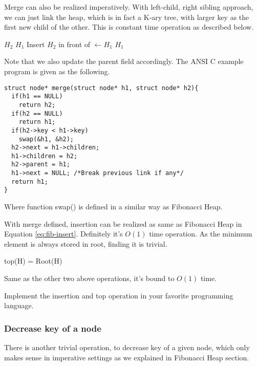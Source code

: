 \documentclass{article}
\begin{document}
Merge can also be realized imperatively. With left-child, right
sibling approach, we can just link the heap, which is in fact a
K-ary tree, with larger key as the first new child of the other.
This is constant time operation as described below.

\begin{algorithmic}[1]
    \State \Return $H_2$
  \EndIf
    \State \Return $H_1$
  \EndIf
    \State {}
  \EndIf
  \State Insert $H_2$ in front of 
  \State {} $\gets H_1$
  \State \Return $H_1$
\EndFunction
\end{algorithmic}

Note that we also update the parent field accordingly. The ANSI C
example program is given as the following.

\lstset{language=C}
\begin{lstlisting}
struct node* merge(struct node* h1, struct node* h2){
  if(h1 == NULL)
    return h2;
  if(h2 == NULL)
    return h1;
  if(h2->key < h1->key)
    swap(&h1, &h2);
  h2->next = h1->children;
  h1->children = h2;
  h2->parent = h1;
  h1->next = NULL; /*Break previous link if any*/
  return h1;
}
\end{lstlisting}

Where function swap() is defined in a similar way as Fibonacci Heap.

With merge defined, insertion can be realized as same as Fibonacci Heap
in Equation \ref{eq:fib-insert}. Definitely it's $O(1)$ time operation.
As the minimum element is always stored in root, finding it is trivial.

\be
top(H) = Root(H)
\ee

Same as the other two above operations, it's bound to $O(1)$ time.

\begin{Exercise}
Implement the insertion and top operation in your favorite programming
language.
\end{Exercise}

\subsubsection{Decrease key of a node}
There is another trivial operation, to decrease key of a given node,
which only makes sense in imperative settings as we explained in Fibonacci
Heap section.
\end{document}
